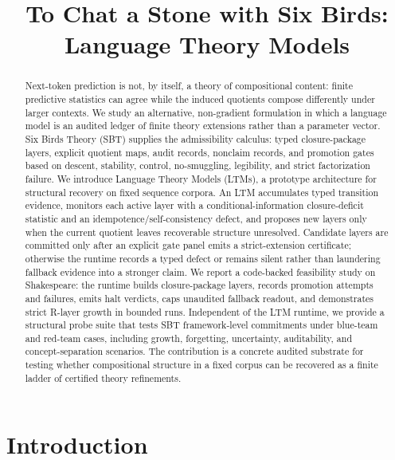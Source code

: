 \documentclass{article}
\title{To Chat a Stone with Six Birds: Language Theory Models}
\author{}
\theoremstyle{definition}
\begin{document}
\maketitle

\begin{abstract}


Next-token prediction is not, by itself, a theory of compositional content: finite predictive statistics can agree while the induced quotients compose differently under larger contexts. We study an alternative, non-gradient formulation in which a language model is an audited ledger of finite theory extensions rather than a parameter vector. Six Birds Theory (SBT) supplies the admissibility calculus: typed closure-package layers, explicit quotient maps, audit records, nonclaim records, and promotion gates based on descent, stability, control, no-smuggling, legibility, and strict factorization failure. We introduce Language Theory Models (LTMs), a prototype architecture for structural recovery on fixed sequence corpora. An LTM accumulates typed transition evidence, monitors each active layer with a conditional-information closure-deficit statistic and an idempotence/self-consistency defect, and proposes new layers only when the current quotient leaves recoverable structure unresolved. Candidate layers are committed only after an explicit gate panel emits a strict-extension certificate; otherwise the runtime records a typed defect or remains silent rather than laundering fallback evidence into a stronger claim. We report a code-backed feasibility study on Shakespeare: the runtime builds closure-package layers, records promotion attempts and failures, emits halt verdicts, caps unaudited fallback readout, and demonstrates strict R-layer growth in bounded runs. Independent of the LTM runtime, we provide a structural probe suite that tests SBT framework-level commitments under blue-team and red-team cases, including growth, forgetting, uncertainty, auditability, and concept-separation scenarios. The contribution is a concrete audited substrate for testing whether compositional structure in a fixed corpus can be recovered as a finite ladder of certified theory refinements.
 \end{abstract}

\section{Introduction}\label{sec:introduction}
\end{document}
